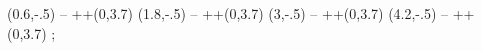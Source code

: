 

  (0.6,-.5) -- ++(0,3.7)
  (1.8,-.5) -- ++(0,3.7)
  (3,-.5) -- ++(0,3.7)
  (4.2,-.5) -- ++(0,3.7)
;